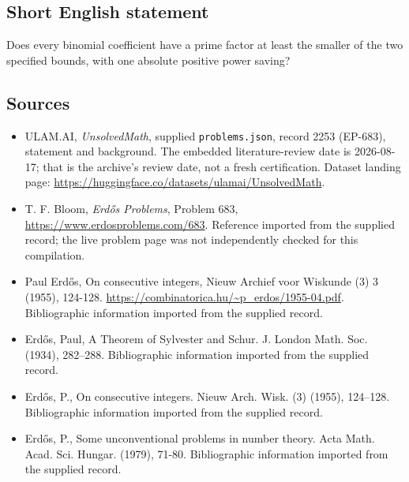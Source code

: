 \documentclass[11pt,a4paper]{article}
\begin{document}
\subsection{Short English statement}

Does every binomial coefficient have a prime factor at least the smaller of the two specified bounds, with one absolute positive power saving?

\subsection{Sources}

{\small

\begin{itemize}

\item[\hypertarget{source:2253:1}{S1}] ULAM.AI, \emph{UnsolvedMath}, supplied \texttt{problems.json}, record 2253 (EP-683), statement and background. The embedded literature-review date is 2026-08-17; that is the archive’s review date, not a fresh certification. Dataset landing page: \url{https://huggingface.co/datasets/ulamai/UnsolvedMath}.

\item[\hypertarget{source:2253:2}{S2}] T. F. Bloom, \emph{Erdős Problems}, Problem 683, \url{https://www.erdosproblems.com/683}. Reference imported from the supplied record; the live problem page was not independently checked for this compilation.

\item[\hypertarget{source:2253:3}{S3}] Paul Erdős, On consecutive integers, Nieuw Archief voor Wiskunde (3) 3 (1955), 124-128. \url{https://combinatorica.hu/~p_erdos/1955-04.pdf}. Bibliographic information imported from the supplied record.

\item[\hypertarget{source:2253:4}{S4}] Erd\H{o}s, Paul, A {T}heorem of {S}ylvester and {S}chur. J. London Math. Soc. (1934), 282--288. Bibliographic information imported from the supplied record.

\item[\hypertarget{source:2253:5}{S5}] Erd\H{o}s, P., On consecutive integers. Nieuw Arch. Wisk. (3) (1955), 124--128. Bibliographic information imported from the supplied record.

\item[\hypertarget{source:2253:6}{S6}] Erd\H{o}s, P., Some unconventional problems in number theory. Acta Math. Acad. Sci. Hungar. (1979), 71-80. Bibliographic information imported from the supplied record.

\end{itemize}

}

\label{end:2253}
\end{document}
